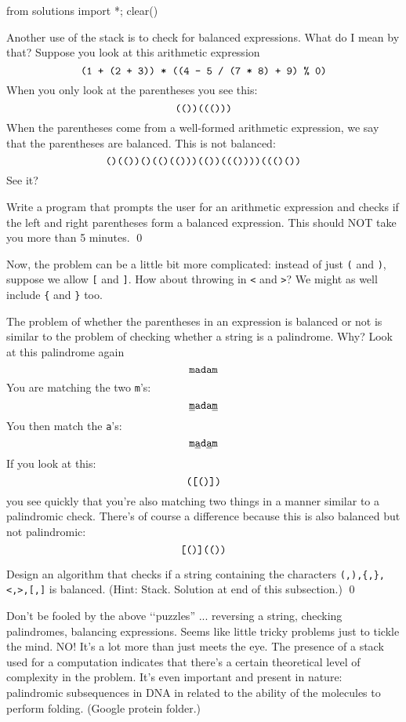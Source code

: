 \begin{python0}
from solutions import *; clear()
\end{python0}

Another use of the stack is to check for balanced expressions.
What do I mean by that?
Suppose you look at this arithmetic expression
\[
\text{
  \texttt{(1 + (2 + 3)) * ((4 - 5 / (7 * 8) + 9) \% 0)}
  }
\]
When you only look at the parentheses you see this:
\[
\text{\texttt{(())((()))}}
\]
When the parentheses come from a well-formed arithmetic expression,
we say that the parentheses are balanced.
This is not balanced:
\[
\text{\texttt{()(())()(()(()))(())((())))((()())}}
\]
See it?

\begin{ex}
Write a program that prompts the user for an arithmetic expression
and checks if the left and right parentheses form a balanced expression.
This should NOT take you more than 5 minutes.
\qed
\end{ex}

Now, the problem can be a little bit more complicated:
instead of just \texttt{(} and \texttt{)},
suppose we allow \texttt{[} and \texttt{]}.
How about throwing in
\texttt{<} and \texttt{>}?
We might as well include
\texttt{\{} and \texttt{\}} too.

The problem of whether the parentheses in an expression is balanced or not
is similar to the problem of checking whether a string is a palindrome.
Why?
Look at this palindrome again
\[
\text{\texttt{madam}}
\]
You are matching the two \texttt{m}'s:
\[
\text{\texttt{\underline{m}ada\underline{m}}}
\]
You then match the \texttt{a}'s:
\[
\text{\texttt{m\underline{a}d\underline{a}m}}
\]
If you look at this:
\[
\text{\texttt{([()])}}
\]
you see quickly that you're also matching two things in a manner
similar to a palindromic check.
There's of course a difference because this is also balanced
but not palindromic:
\[
\text{\texttt{[()](())}}
\]

\begin{ex}\label{ex:balanced-expression-multiple-pairs}
Design an algorithm 
that checks if a string containing the characters
\verb!(,),{,},<,>,[,]! is balanced.
(Hint: Stack. Solution at end of this subsection.)
\qed
\end{ex}


Don't be fooled by the above
\lq\lq puzzles'' ... reversing a string, checking palindromes,
balancing expressions.
Seems like little tricky problems just to tickle the mind.
NO!
It's a lot more than just meets the eye.
The presence of a stack used for a computation
indicates that there's a certain theoretical level of
complexity in the problem.
It's even important and present in nature:
palindromic subsequences in DNA in related to the ability of the
molecules to perform folding. (Google protein folder.)

